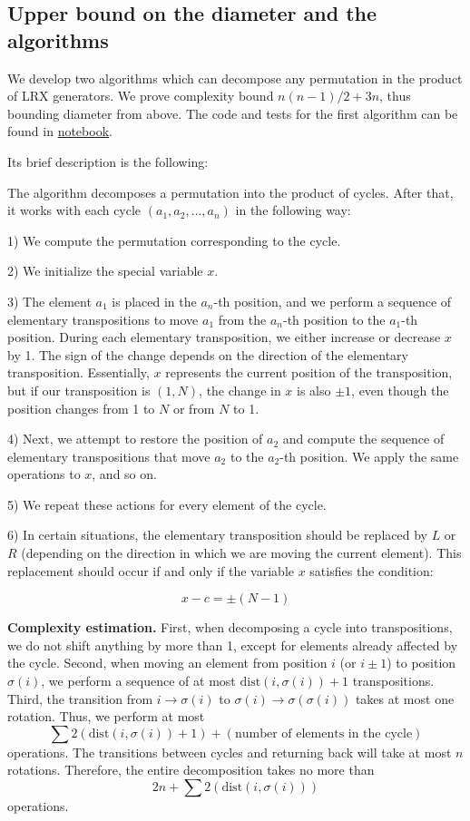 \documentclass[reqno,11pt]{amsart}
\begin{document}
\subsection{Upper bound on the diameter and the algorithms}
We develop two algorithms which can decompose any permutation in the product of LRX generators. We prove  complexity bound $n(n-1)/2+3n$, thus bounding diameter from above. The code and tests for the first algorithm can be found in \href{https://www.kaggle.com/code/mixnota/article-project}{notebook}.

Its brief description is the following:

The algorithm decomposes a permutation into the product of cycles. After that, it works with each cycle \( (a_1, a_2, \dots, a_n) \) in the following way:

1) We compute the permutation corresponding to the cycle.

2) We initialize the special variable \( x \).

3) The element \( a_1 \) is placed in the \( a_n \)-th position, and we perform a sequence of elementary transpositions to move \( a_1 \) from the \( a_n \)-th position to the \( a_1 \)-th position. During each elementary transposition, we either increase or decrease \( x \) by 1. The sign of the change depends on the direction of the elementary transposition. Essentially, \( x \) represents the current position of the transposition, but if our transposition is \( (1, N) \), the change in \( x \) is also \( \pm1 \), even though the position changes from 1 to \( N \) or from \( N \) to 1.

4) Next, we attempt to restore the position of \( a_2 \) and compute the sequence of elementary transpositions that move \( a_2 \) to the \( a_2 \)-th position. We apply the same operations to \( x \), and so on.

5) We repeat these actions for every element of the cycle.

6) In certain situations, the elementary transposition should be replaced by \( L \) or \( R \) (depending on the direction in which we are moving the current element). This replacement should occur if and only if the variable \( x \) satisfies the condition:

\[
x - c = \pm (N - 1)
\]


\textbf{Complexity estimation.}
First, when decomposing a cycle into transpositions, we do not shift anything by more than 1, except for elements already affected by the cycle.
Second, when moving an element from position \( i \) (or \( i \pm 1 \)) to position \( \sigma(i) \), we perform a sequence of at most \( \text{dist}(i, \sigma(i)) + 1 \) transpositions.
Third, the transition from \( i \to \sigma(i) \) to \( \sigma(i) \to \sigma(\sigma(i)) \) takes at most one rotation.
Thus, we perform at most  
\[
\sum 2(\text{dist}(i, \sigma(i)) + 1) + (\text{number of elements in the cycle})
\]
operations. The transitions between cycles and returning back will take at most \( n \) rotations.
Therefore, the entire decomposition takes no more than  
\[
2n + \sum 2(\text{dist}(i, \sigma(i)))
\]
operations.
\end{document}
